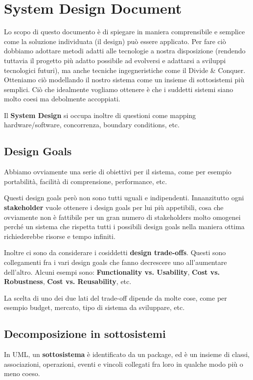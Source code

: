 \chapter{System Design Document}

    Lo scopo di questo documento è di spiegare in maniera comprensibile e semplice come la soluzione individuata (il design) può essere applicato. Per fare ciò dobbiamo adottare metodi adatti alle tecnologie a nostra disposizione (rendendo tuttavia il progetto più adatto possibile ad evolversi e adattarsi a sviluppi tecnologici futuri), ma anche tecniche ingegneristiche come il Divide \& Conquer. Otteniamo ciò modellando il nostro sistema come un insieme di sottosistemi più semplici.
    Ciò che idealmente vogliamo ottenere è che i suddetti sistemi siano molto coesi ma debolmente accoppiati.
    
    Il \textbf{System Design} si occupa inoltre di questioni come mapping hardware/software, concorrenza, boundary conditions, etc.
    
    \section{Design Goals}
    
        Abbiamo ovviamente una serie di obiettivi per il sistema, come per esempio portabilità, facilità di comprensione, performance, etc.
        
        Questi design goals però non sono tutti uguali e indipendenti. Innanzitutto ogni \textbf{stakeholder} vuole ottenere i design goals per lui più appetibili, cosa che ovviamente non è fattibile per un gran numero di stakeholders molto omogenei perché un sistema che rispetta tutti i possibili design goals nella maniera ottima richiederebbe risorse e tempo infiniti.
        
        Inoltre ci sono da considerare i cosiddetti \textbf{design trade-offs}. Questi sono collegamenti fra i vari design goals che fanno decrescere uno all'aumentare dell'altro. Alcuni esempi sono: \textbf{Functionality vs. Usability}, \textbf{Cost vs. Robustness}, \textbf{Cost vs. Reusability}, etc.
        
        La scelta di uno dei due lati del trade-off dipende da molte cose, come per esempio budget, mercato, tipo di sistema da sviluppare, etc.
    
        
    \section{Decomposizione in sottosistemi}
        In UML, un \textbf{sottosistema} è identificato da un package, ed è un insieme di classi, associazioni, operazioni, eventi e vincoli collegati fra loro in qualche modo più o meno coeso.
        
